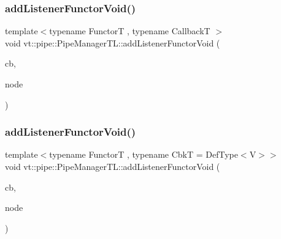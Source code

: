 \subsubsection{\texorpdfstring{add\+Listener\+Functor\+Void()}{addListenerFunctorVoid()}\hspace{0.1cm}{\footnotesize\ttfamily [1/2]}}
{\footnotesize\ttfamily template$<$typename FunctorT , typename CallbackT $>$ \\
void vt\+::pipe\+::\+Pipe\+Manager\+T\+L\+::add\+Listener\+Functor\+Void (\begin{DoxyParamCaption}\item[{CallbackT const \&}]{cb,  }\item[{\hyperlink{namespacevt_a866da9d0efc19c0a1ce79e9e492f47e2}{Node\+Type} const \&}]{node }\end{DoxyParamCaption})}

\mbox{\label{structvt_1_1pipe_1_1_pipe_manager_t_l_a12cd5abf9d9a082369419a5cc5b7b0f8}} 
\subsubsection{\texorpdfstring{add\+Listener\+Functor\+Void()}{addListenerFunctorVoid()}\hspace{0.1cm}{\footnotesize\ttfamily [2/2]}}
{\footnotesize\ttfamily template$<$typename FunctorT , typename CbkT  = Def\+Type$<$\+V$>$$>$ \\
void vt\+::pipe\+::\+Pipe\+Manager\+T\+L\+::add\+Listener\+Functor\+Void (\begin{DoxyParamCaption}\item[{CbkT const \&}]{cb,  }\item[{\hyperlink{namespacevt_a866da9d0efc19c0a1ce79e9e492f47e2}{Node\+Type} const \&}]{node }\end{DoxyParamCaption})}

\mbox{\label{structvt_1_1pipe_1_1_pipe_manager_t_l_aff965bd75d398d45ad11d33feeb7a7c5}} 

